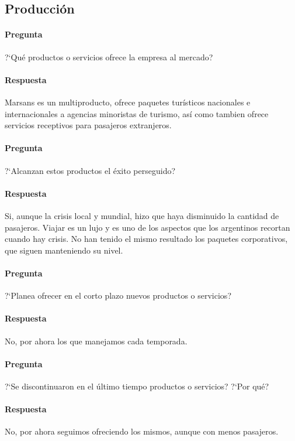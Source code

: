 \documentclass[12pt,a4paper,spanish]{article}
\begin{document}
	\subsection{Producci\'on}

	\paragraph{Pregunta}
	 ?`Qu\'e productos o servicios ofrece la empresa al mercado?
	\paragraph{Respuesta}
	Marsans es un multiproducto, ofrece paquetes tur\'isticos nacionales e internacionales a agencias minoristas de turismo, as\'i como tambien ofrece servicios receptivos para pasajeros extranjeros.

	\paragraph{Pregunta}
	 ?`Alcanzan estos productos el \'exito perseguido?
	\paragraph{Respuesta}
	Si, aunque la crisis local y mundial, hizo que haya disminuido la cantidad de pasajeros. Viajar es un lujo y es uno de los aspectos que los argentinos recortan cuando hay crisis. No han tenido el mismo resultado  los paquetes corporativos, que siguen manteniendo su nivel.

	\paragraph{Pregunta}
	 ?`Planea ofrecer en el corto plazo nuevos productos o servicios?
	\paragraph{Respuesta}
	No, por ahora los que manejamos cada temporada.

	\paragraph{Pregunta}
	 ?`Se discontinuaron en el \'ultimo tiempo productos o servicios?  ?`Por qu\'e?
	\paragraph{Respuesta}
	No, por ahora seguimos ofreciendo los mismos, aunque con menos pasajeros.
\end{document}
